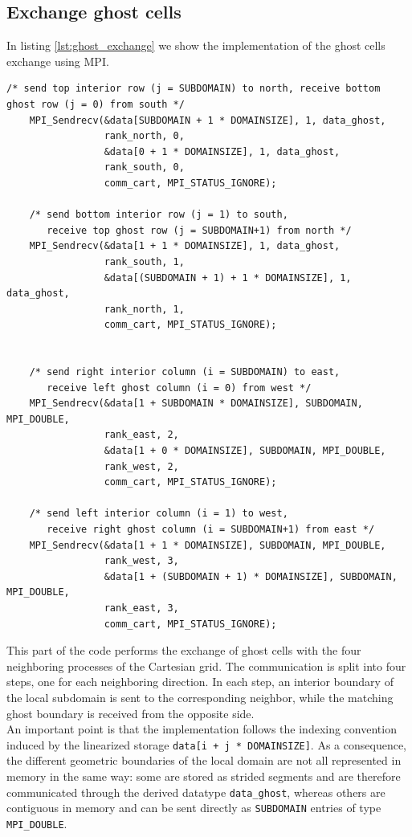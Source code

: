 \documentclass[unicode,10pt,a4paper,oneside,numbers=endperiod,openany]{scrartcl}
\begin{document}
\subsection{Exchange ghost cells}
In listing \ref{lst:ghost_exchange} we show the implementation of the ghost cells exchange using MPI.
\begin{lstlisting}[style=grayverbatim, caption={Ghost cells exchange using MPI}, label={lst:ghost_exchange}]
/* send top interior row (j = SUBDOMAIN) to north, receive bottom ghost row (j = 0) from south */
    MPI_Sendrecv(&data[SUBDOMAIN + 1 * DOMAINSIZE], 1, data_ghost,
                 rank_north, 0,
                 &data[0 + 1 * DOMAINSIZE], 1, data_ghost,
                 rank_south, 0,
                 comm_cart, MPI_STATUS_IGNORE);

    /* send bottom interior row (j = 1) to south,
       receive top ghost row (j = SUBDOMAIN+1) from north */
    MPI_Sendrecv(&data[1 + 1 * DOMAINSIZE], 1, data_ghost,
                 rank_south, 1,
                 &data[(SUBDOMAIN + 1) + 1 * DOMAINSIZE], 1, data_ghost,
                 rank_north, 1,
                 comm_cart, MPI_STATUS_IGNORE);


    /* send right interior column (i = SUBDOMAIN) to east,
       receive left ghost column (i = 0) from west */
    MPI_Sendrecv(&data[1 + SUBDOMAIN * DOMAINSIZE], SUBDOMAIN, MPI_DOUBLE,
                 rank_east, 2,
                 &data[1 + 0 * DOMAINSIZE], SUBDOMAIN, MPI_DOUBLE,
                 rank_west, 2,
                 comm_cart, MPI_STATUS_IGNORE);

    /* send left interior column (i = 1) to west,
       receive right ghost column (i = SUBDOMAIN+1) from east */
    MPI_Sendrecv(&data[1 + 1 * DOMAINSIZE], SUBDOMAIN, MPI_DOUBLE,
                 rank_west, 3,
                 &data[1 + (SUBDOMAIN + 1) * DOMAINSIZE], SUBDOMAIN, MPI_DOUBLE,
                 rank_east, 3,
                 comm_cart, MPI_STATUS_IGNORE);
\end{lstlisting}

This part of the code performs the exchange of ghost cells with the four neighboring processes of the Cartesian grid. The communication is split into four steps, one for each neighboring direction. In each step, an interior boundary of the local subdomain is sent to the corresponding neighbor, while the matching ghost boundary is received from the opposite side.\\

An important point is that the implementation follows the indexing convention induced by the linearized storage \texttt{data[i + j * DOMAINSIZE]}. As a consequence, the different geometric boundaries of the local domain are not all represented in memory in the same way: some are stored as strided segments and are therefore communicated through the derived datatype \texttt{data\_ghost}, whereas others are contiguous in memory and can be sent directly as \texttt{SUBDOMAIN} entries of type \texttt{MPI\_DOUBLE}.\\
\end{document}
